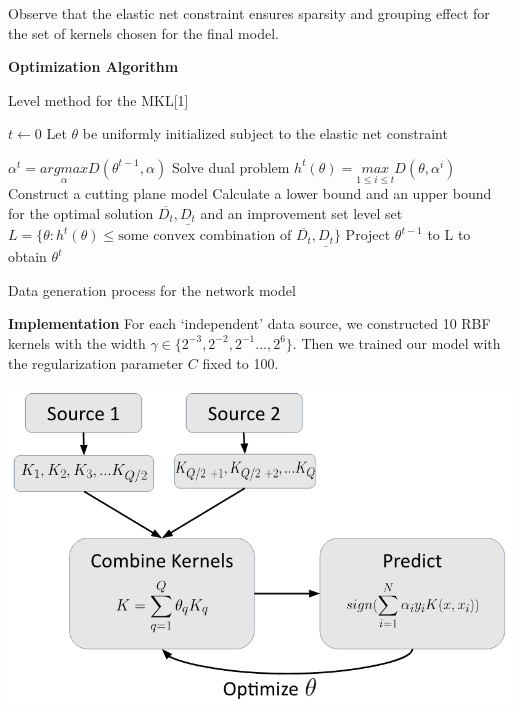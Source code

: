 \documentclass{article}
\begin{document}
Observe that the elastic net constraint ensures sparsity and grouping effect
for the set of kernels chosen for the final model.

\textbf{Optimization Algorithm}

\begin{algorithm}
\centering
\begin{algorithmic}[1]
    \caption{Level method for the MKL[1]}

    \item[] 
    \State $t \leftarrow 0$
    \State Let $\theta$ be uniformly initialized subject to the elastic net constraint

    \item[]
        \State $\alpha^{t} = \underset{\alpha}{argmax}D(\theta^{t-1}, \alpha)$
            \Comment Solve dual problem
        \State $h^t(\theta) = \underset{1 \leq i \leq t}{max} D(\theta, \alpha^i)$
            \Comment Construct a cutting plane model
        \State Calculate a lower bound and an upper bound for the optimal solution $\overline{D_t}, \underline{D_t}$ and an improvement set level set $L = \{\theta: h^t(\theta) \leq \text{some convex combination of }\overline{D_t}, \underline{D_t}\}$
        \State Project $\theta^{t-1}$ to L to obtain $\theta^t$
    \EndWhile
\end{algorithmic}
\caption{Data generation process for the network model}
\label{alg:network_model}
\end{algorithm}

\textbf{Implementation}
For each `independent' data source, we constructed 10 RBF kernels with the
width $\gamma \in \{2^{-3}, 2^{-2}, 2^{-1} ..., 2^{6}\}$. Then we trained our
model with the regularization parameter $C$ fixed to 100.

\begin{minipage}{\textwidth}
    \centering
    \includegraphics[scale=.4]{implementation_flowchart.png}
    \label{fig:implementation_flowchart}
\end{minipage}
\end{document}
